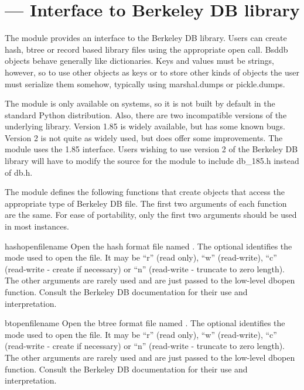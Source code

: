 \section{ ---
         Interface to Berkeley DB library}



The  module provides an interface to the Berkeley DB library.
Users can create hash, btree or record based library files using the
appropriate open call. Bsddb objects behave generally like dictionaries.
Keys and values must be strings, however, so to use other objects as keys or 
to store other kinds of objects the user must serialize them somehow,
typically using marshal.dumps or pickle.dumps.

The  module is only available on \UNIX{} systems, so it is not
built by default in the standard Python distribution.  Also, there are two
incompatible versions of the underlying library.  Version 1.85 is widely
available, but has some known bugs.  Version 2 is not quite as widely used,
but does offer some improvements.  The  module uses the 1.85
interface.  Users wishing to use version 2 of the Berkeley DB library will
have to modify the source for the module to include db_185.h instead of
db.h.

The  module defines the following functions that create
objects that access the appropriate type of Berkeley DB file.  The first two
arguments of each function are the same.  For ease of portability, only the
first two arguments should be used in most instances.

\begin{funcdesc}{hashopen}{filename}
Open the hash format file named .  The optional 
identifies the mode used to open the file.  It may be ``r'' (read only),
``w'' (read-write), ``c'' (read-write - create if necessary) or ``n''
(read-write - truncate to zero length).  The other arguments are rarely used
and are just passed to the low-level dbopen function.  Consult the
Berkeley DB documentation for their use and interpretation.
\end{funcdesc}


\begin{funcdesc}{btopen}{filename}
Open the btree format file named .  The optional 
identifies the mode used to open the file.  It may be ``r'' (read only),
``w'' (read-write), ``c'' (read-write - create if necessary) or ``n''
(read-write - truncate to zero length).  The other arguments are rarely used
and are just passed to the low-level dbopen function.  Consult the
Berkeley DB documentation for their use and interpretation.
\end{funcdesc}

